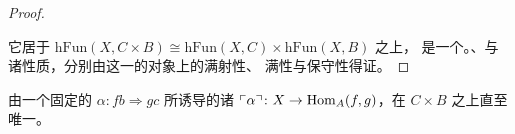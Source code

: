 \begin{proof}
\begin{center}
\end{center}
它居于 $\mathrm{hFun}(X,C\times B)\cong\mathrm{hFun}(X,C)\times\mathrm{hFun}(X,B)$ 之上，%
是一个\trSmotheringFunctor{}。\trOneCellInduction{}、\trTwoCellInduction{}与%
\trTwoCellConservativity{}诸性质，分别由这一\trSmotheringFunctor{}的对象上的满射性、%
满性与保守性得证。
\end{proof}

由一个固定的\trNaturalTransformation{} $\alpha\colon fb\Rightarrow gc$ 所诱导的诸%
\trFunctor{} $\ulcorner\alpha\urcorner\colon X\to\mathrm{Hom}_A(f,g)$，在 $C\times B$ 之上直至%
\trFiberedIsomorphism{}唯一。

